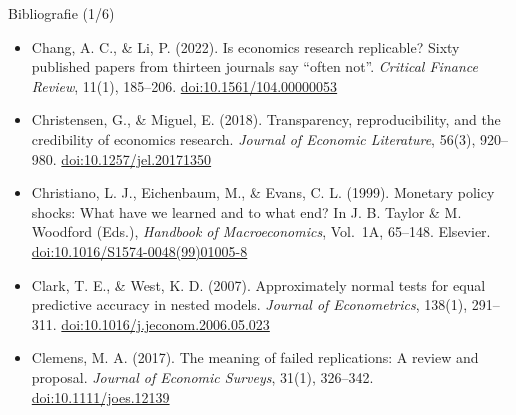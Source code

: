 \begin{frame}{Bibliografie (1/6)}
\begin{itemize}
    \item Chang, A. C., \& Li, P. (2022). Is economics research replicable? Sixty published papers from thirteen journals say ``often not''. \textit{Critical Finance Review}, 11(1), 185--206. \href{https://doi.org/10.1561/104.00000053}{doi:10.1561/104.00000053}
    \item Christensen, G., \& Miguel, E. (2018). Transparency, reproducibility, and the credibility of economics research. \textit{Journal of Economic Literature}, 56(3), 920--980. \href{https://doi.org/10.1257/jel.20171350}{doi:10.1257/jel.20171350}
    \item Christiano, L. J., Eichenbaum, M., \& Evans, C. L. (1999). Monetary policy shocks: What have we learned and to what end? In J. B. Taylor \& M. Woodford (Eds.), \textit{Handbook of Macroeconomics}, Vol.\ 1A, 65--148. Elsevier. \href{https://doi.org/10.1016/S1574-0048(99)01005-8}{doi:10.1016/S1574-0048(99)01005-8}
    \item Clark, T. E., \& West, K. D. (2007). Approximately normal tests for equal predictive accuracy in nested models. \textit{Journal of Econometrics}, 138(1), 291--311. \href{https://doi.org/10.1016/j.jeconom.2006.05.023}{doi:10.1016/j.jeconom.2006.05.023}
    \item Clemens, M. A. (2017). The meaning of failed replications: A review and proposal. \textit{Journal of Economic Surveys}, 31(1), 326--342. \href{https://doi.org/10.1111/joes.12139}{doi:10.1111/joes.12139}
\end{itemize}
\end{frame}

